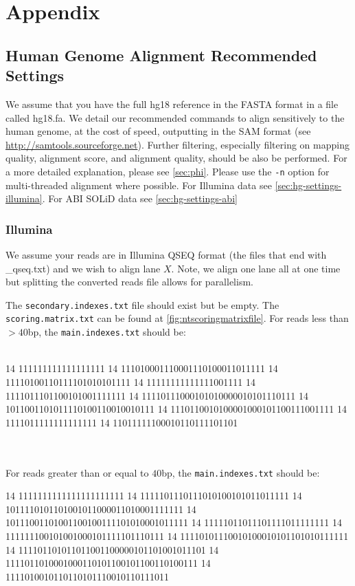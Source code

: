 \documentclass[a4paper,12pt]{book}
\begin{document}
\chapter{Appendix}
\section{Human Genome Alignment Recommended Settings}
\label{sec:hg-settings}
We assume that you have the full hg18 reference in the FASTA format in a file called hg18.fa.
We detail our recommended commands to align sensitively to the human genome, at the cost of speed, outputting in the SAM format (see \url{http://samtools.sourceforge.net}).
Further filtering, especially filtering on mapping quality, alignment score, and alignment quality, should be also be performed.
For a more detailed explanation, please see \autoref{sec:phi}.
Please use the {\tt -n} option for multi-threaded alignment where possible.
For Illumina data see \autoref{sec:hg-settings-illumina}. 
For ABI SOLiD data see \autoref{sec:hg-settings-abi}

\subsection{Illumina}
\label{sec:hg-settings-illumina}
We assume your reads are in Illumina QSEQ format (the files that end with \_qseq.txt) and we wish to align lane $X$.
Note, we align one lane all at one time but splitting the converted reads file allows for parallelism.

The {\tt secondary.indexes.txt} file should exist but be empty.
The {\tt scoring.matrix.txt} can be found at \autoref{fig:ntscoringmatrixfile}. 
For reads less than $>40$bp, the {\tt main.indexes.txt} should be:\\
\\
\begin{boxedverbatim}
14 111111111111111111
14 111010001110001110100011011111
14 11110100110111101010101111
14 11111111111111001111
14 1111011101100101001111111
14 11110111000101010000010101110111
14 1011001101011110100110010010111
14 1110110010100001000101100111001111
14 1111011111111111111
14 11011111100010110111101101
\end{boxedverbatim}
\\
\\
For reads greater than or equal to $40$bp, the {\tt main.indexes.txt} should be:\\
\begin{boxedverbatim}
14 1111111111111111111111
14 1111101110111010100101011011111
14 1011110101101001011000011010001111111
14 10111001101001100100111101010001011111
14 11111011011101111011111111
14 111111100101001000101111101110111
14 11110101110010100010101101010111111
14 111101101011011001100000101101001011101
14 1111011010001000110101100101100110100111
14 1111010010110110101110010110111011
\end{boxedverbatim}
\\
\end{document}
